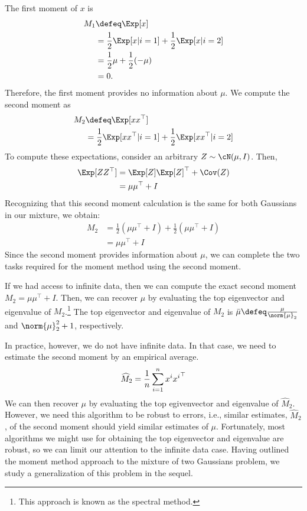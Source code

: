 The first moment of $x$ is
\begin{align}
    M_1 &\defeq \Exp [x] \\
    &= \frac{1}{2}\Exp [x|i=1]+\frac{1}{2}\Exp[x|i=2] \\
    &= \frac{1}{2}\mu + \frac{1}{2}(-\mu) \\
    &= 0.
\end{align}
Therefore, the first moment provides no information about $\mu$. We compute the second moment as
\begin{align}
    M_2 &\defeq \Exp[xx^\top] \\
    &= \frac{1}{2}\Exp[xx^\top|i=1]+\frac{1}{2}\Exp[xx^\top|i=2]
\end{align}
To compute these expectations, consider an arbitrary $Z \sim \cN(\mu, I)$. Then,
\begin{align}
    \Exp [ZZ^\top] &= \Exp[Z] \Exp[Z]^\top + \Cov(Z) \\
    &= \mu \mu^\top + I
\end{align}
Recognizing that this second moment calculation is the same for both Gaussians in our mixture, we obtain:
\begin{align}
    M_2 &= \frac{1}{2}(\mu\mu^\top+I)+\frac{1}{2}(\mu\mu^\top+I) \\
    &=\mu\mu^\top+I
\end{align}
Since the second moment provides information about $\mu$, we can complete the two tasks required for the moment method using the second moment.

If we had access to infinite data, then we can compute the exact second moment $M_2=\mu\mu^\top+I$. Then, we can recover $\mu$ by evaluating the top eigenvector and eigenvalue of $M_2$.\footnote{This approach is known as the spectral method.} The top eigenvector and eigenvalue of $M_2$ is $\bar{\mu} \defeq \frac{\mu}{\norm{\mu}_2}$ and $\norm{\mu}_2^2+1$, respectively. 

In practice, however, we do not have infinite data. In that case, we need to estimate the second moment by an empirical average.
\begin{align}
    \widehat{M}_2=\frac{1}{n}\sum_{i=1}^nx\sp{i} {x\sp{i}}^\top
\end{align}
We can then recover $\mu$ by evaluating the top egivenvector and eigenvalue of $\widehat{M}_2$. However, we need this algorithm to be robust to errors, i.e., similar estimates, $\widehat{M}_2$, of the second moment should yield similar estimates of $\mu$. Fortunately, most algorithms we might use for obtaining the top eigenvector and eigenvalue are robust, so we can limit our attention to the infinite data case. Having outlined the moment method approach to the mixture of two Gaussians problem, we study a generalization of this problem in the sequel.

